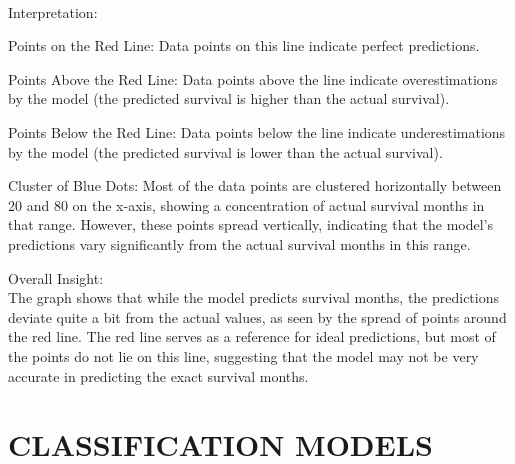 \documentclass[11pt]{article}
\begin{document}
    \begin{center}
    \end{center}
    { \hspace*{\fill} \\}
    
    Interpretation:

Points on the Red Line: Data points on this line indicate perfect
predictions.

Points Above the Red Line: Data points above the line indicate
overestimations by the model (the predicted survival is higher than the
actual survival).

Points Below the Red Line: Data points below the line indicate
underestimations by the model (the predicted survival is lower than the
actual survival).

Cluster of Blue Dots: Most of the data points are clustered horizontally
between 20 and 80 on the x-axis, showing a concentration of actual
survival months in that range. However, these points spread vertically,
indicating that the model's predictions vary significantly from the
actual survival months in this range.

Overall Insight:\\
The graph shows that while the model predicts survival months, the
predictions deviate quite a bit from the actual values, as seen by the
spread of points around the red line. The red line serves as a reference
for ideal predictions, but most of the points do not lie on this line,
suggesting that the model may not be very accurate in predicting the
exact survival months.

    \section{CLASSIFICATION MODELS}\label{classification-models}
\end{document}
